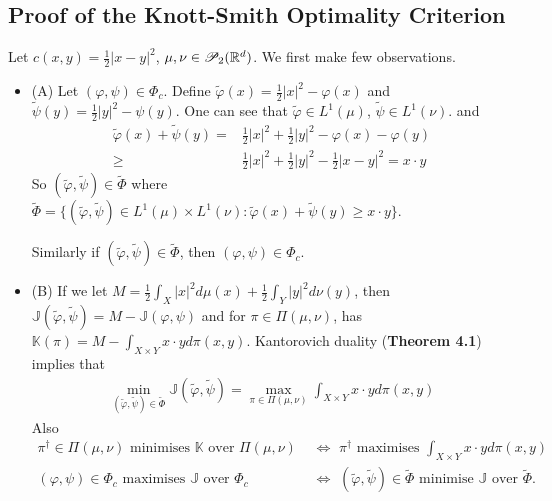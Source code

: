 \documentclass[12pt,a4paper]{article}
\renewenvironment{i}
{\begin{itemize} 
	}%
	{\end{itemize}
}
\begin{document}
\subsection{Proof of the Knott-Smith Optimality Criterion}

Let $c(x,y) = \frac{1}{2} |x-y|^2$, $\mu, \nu \in \mathscr{P}_2 (\mathbb{R}^d)$. We first make few observations. 
\begin{i}
\item[(A)] Let $(\varphi, \psi) \in \Phi_c$. Define $\tilde{\varphi}(x) = \frac{1}{2} |x|^2 - \varphi(x)$ and $\tilde{\psi}(y) = \frac{1}{2} |y|^2 - \psi(y)$. One can see that $\tilde{\varphi} \in L^1(\mu)$, $\tilde{\psi} \in L^1(\nu)$. and 
\begin{align*}
\tilde{\varphi}(x) + \tilde{\psi}(y) =& \frac{1}{2} |x|^2 + \frac{1}{2} |y|^2 - \varphi(x) - \varphi(y) \\
\geq & \frac{1}{2} |x|^2 + \frac{1}{2} |y|^2 - \frac{1}{2} |x-y|^2 = x\cdot y
\end{align*}
So $(\tilde{\varphi}, \tilde{\psi}) \in \tilde{\Phi}$ where $\tilde{\Phi} = \{(\tilde{\varphi}, \tilde{\psi}) \in L^1(\mu) \times L^1(\nu) : \tilde{\varphi}(x) + \tilde{\psi}(y) \geq x\cdot y\}$.

\quad Similarly if $(\tilde{\varphi}, \tilde{\psi}) \in \tilde{\Phi}$, then $(\varphi, \psi) \in \Phi_c$.

\item[(B)] If we let $M = \frac{1}{2}\int_X |x|^2 d\mu(x) + \frac{1}{2} \int_Y |y|^2 d\nu(y)$, then $\mathbb{J}(\tilde{\varphi}, \tilde{\psi}) = M - \mathbb{J}(\varphi, \psi)$ and for $\pi \in \Pi(\mu, \nu)$, has $\mathbb{K}(\pi) = M - \int_{X\times Y} x\cdot y d\pi(x,y)$. Kantorovich duality (\textbf{Theorem 4.1}) implies that
\begin{align*}
\min_{(\tilde{\varphi}, \tilde{\psi}) \in \tilde{\Phi}} \mathbb{J}(\tilde{\varphi}, \tilde{\psi})  = \max_{\pi \in \Pi(\mu, \nu)} \int_{X\times Y} x\cdot y d\pi(x,y)
\end{align*}
Also 
\begin{align*}
\pi^{\dagger} \in \Pi(\mu, \nu)\text{ minimises }\mathbb{K}\text{ over }\Pi(\mu, \nu) \,\, &\Leftrightarrow \,\, \pi^{\dagger}\text{ maximises }\int_{X\times Y} x\cdot y d\pi(x,y) \\
(\varphi, \psi) \in \Phi_c\text{ maximises }\mathbb{J}\text{ over }\Phi_c \,\, & \Leftrightarrow \,\,(\tilde{\varphi}, \tilde{\psi}) \in \tilde{\Phi}\text{ minimise }\mathbb{J}\text{ over }\tilde{\Phi}.
\end{align*}


\end{i}
\end{document}
